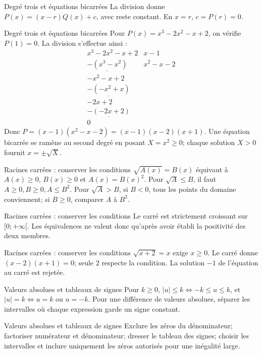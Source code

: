 \documentclass[aspectratio=169,10pt]{beamer}
\begin{document}
\begin{frame}{Degré trois et équations bicarrées}
La division donne \(P(x)=(x-r)Q(x)+c\), avec reste constant. En \(x=r\), \(c=P(r)=0\).
\end{frame}
\begin{frame}{Degré trois et équations bicarrées}
Pour \(P(x)=x^3-2x^2-x+2\), on vérifie \(P(1)=0\). La division s’effectue ainsi :
\[
\begin{array}{r|l}
x^3-2x^2-x+2&x-1\\
\underline{-(x^3-x^2)}&x^2-x-2\\
-x^2-x+2&\\
\underline{-(-x^2+x)}&\\
-2x+2&\\
\underline{-(-2x+2)}&\\
0&
\end{array}
\]
Donc \(P=(x-1)(x^2-x-2)=(x-1)(x-2)(x+1)\). Une équation bicarrée se ramène au second degré en posant \(X=x^2\ge0\); chaque solution \(X>0\) fournit \(x=\pm\sqrt X\).
\end{frame}
\begin{frame}{Racines carrées : conserver les conditions}
\(\sqrt{A(x)}=B(x)\) équivaut à \(A(x)\ge0\), \(B(x)\ge0\) et \(A(x)=B(x)^2\).
Pour \(\sqrt A\le B\), il faut \(A\ge0,B\ge0,A\le B^2\).
Pour \(\sqrt A>B\), si \(B<0\), tous les points du domaine conviennent; si \(B\ge0\), comparer \(A\) à \(B^2\).
\end{frame}
\begin{frame}{Racines carrées : conserver les conditions}
Le carré est strictement croissant sur \([0;+\infty[\). Les équivalences ne valent donc qu’après avoir établi la positivité des deux membres.
\end{frame}
\begin{frame}{Racines carrées : conserver les conditions}
\(\sqrt{x+2}=x\) exige \(x\ge0\). Le carré donne \((x-2)(x+1)=0\); seule \(2\) respecte la condition. La solution \(-1\) de l’équation au carré est rejetée.
\end{frame}
\begin{frame}{Valeurs absolues et tableaux de signes}
Pour \(k\ge0\), \(|u|\le k\Leftrightarrow-k\le u\le k\), et \(|u|=k\Leftrightarrow u=k\) ou \(u=-k\). Pour une différence de valeurs absolues, séparer les intervalles où chaque expression garde un signe constant.
\end{frame}
\begin{frame}{Valeurs absolues et tableaux de signes}
Exclure les zéros du dénominateur; factoriser numérateur et dénominateur; dresser le tableau des signes; choisir les intervalles et inclure uniquement les zéros autorisés pour une inégalité large.
\end{frame}
\end{document}
